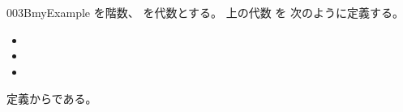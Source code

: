 \documentclass[index]{subfiles}
\begin{document}
\begin{myBlock}{003B}{myExample}
  を階数、
  を\myInlineMath{\myNat}代数とする。
  上の\myInlineMath{\myNat}代数
  を
  次のように定義する。
  \begin{itemize}
  \item {}
  \item {}
  \item {}
  \end{itemize}
  定義からである。
\end{myBlock}
\end{document}
